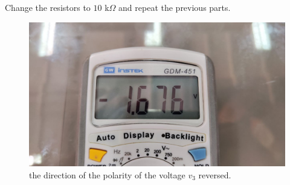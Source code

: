 \documentclass[11pt]{article}
\newcommand{\PicScale}{0.2}
\begin{document}
\begin{question}
\begin{subquestion}{Change the resistors to $10$ k$\Omega$ and repeat the previous parts. }
{            \begin{figure}[H]
                \centering
                \includegraphics[scale=\PicScale,angle=0]{Fig/13.jpeg}
                \caption{the direction of the polarity of the voltage $v_3$ reversed.}
            \end{figure}

        }
    \end{subquestion}

\end{question}

\end{document}
